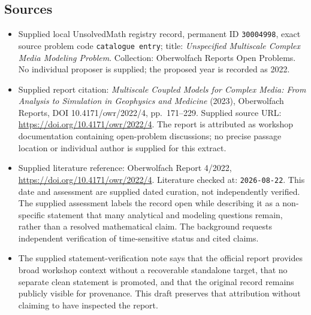 \documentclass[11pt]{article}
\begin{document}
\subsection{Sources}
\begin{itemize}
\item Supplied local UnsolvedMath registry record, permanent ID \texttt{30004998}, exact source problem code \texttt{catalogue entry}; title: \emph{Unspecified Multiscale Complex Media Modeling Problem}. Collection: Oberwolfach Reports Open Problems. No individual proposer is supplied; the proposed year is recorded as 2022.
\item Supplied report citation: \emph{Multiscale Coupled Models for Complex Media: From Analysis to Simulation in Geophysics and Medicine} (2023), Oberwolfach Reports, DOI 10.4171/owr/2022/4, pp.\ 171--229. Supplied source URL: \url{https://doi.org/10.4171/owr/2022/4}. The report is attributed as workshop documentation containing open-problem discussions; no precise passage location or individual author is supplied for this extract.
\item Supplied literature reference: Oberwolfach Report 4/2022, \url{https://doi.org/10.4171/owr/2022/4}. Literature checked at: \texttt{2026-08-22}. This date and assessment are supplied dated curation, not independently verified. The supplied assessment labels the record open while describing it as a non-specific statement that many analytical and modeling questions remain, rather than a resolved mathematical claim. The background requests independent verification of time-sensitive status and cited claims.
\item The supplied statement-verification note says that the official report provides broad workshop context without a recoverable standalone target, that no separate clean statement is promoted, and that the original record remains publicly visible for provenance. This draft preserves that attribution without claiming to have inspected the report.
\end{itemize}
\end{document}
